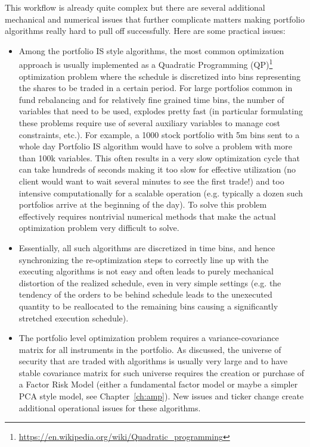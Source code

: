This workflow is already quite complex but there are several additional mechanical and numerical issues that further complicate matters making portfolio algorithms really hard to pull off successfully. Here are some practical issues:

\begin{itemize}
\item Among the portfolio IS style algorithms, the most common optimization approach is usually implemented as a Quadratic Programming (QP)\footnote{\url{https://en.wikipedia.org/wiki/Quadratic_programming}} optimization problem where the schedule is discretized into bins representing the shares to be traded in a certain period.  For large portfolios common in fund rebalancing and for relatively fine grained time bins, the number of variables that need to be used, explodes pretty fast (in particular formulating these problems require use of several auxiliary variables to manage cost constraints, etc.). For example, a 1000 stock portfolio with 5m bins  sent to a whole day Portfolio IS algorithm would have to solve a problem with more than 100k variables. This often results in a very slow  optimization cycle that can take hundreds of seconds making it too slow for effective utilization (no client would want to wait several minutes to see the first trade!) and too intensive computationally for a scalable operation  (e.g. typically a dozen such portfolios arrive at the beginning of the day). To solve this problem effectively requires nontrivial numerical methods that make the actual optimization problem very difficult to solve.

\item Essentially, all such algorithms are discretized in time bins, and hence synchronizing the re-optimization steps to correctly line up with the executing algorithms is not easy and often leads to purely mechanical distortion of the realized schedule, even in very simple settings (e.g. the tendency of the orders to be behind schedule leads to the unexecuted quantity to be reallocated to the remaining bins causing a significantly stretched execution schedule).

\item The portfolio level optimization problem requires a variance-covariance matrix for all instruments in the portfolio. As discussed, the universe of security that are traded with algorithms is usually very large and to have stable covariance matrix for such universe requires the creation or purchase of a Factor Risk Model (either a fundamental factor model or maybe a simpler PCA style model, see Chapter~\ref{ch:amp}). New issues and ticker change create additional operational issues for these algorithms.


\end{itemize}
